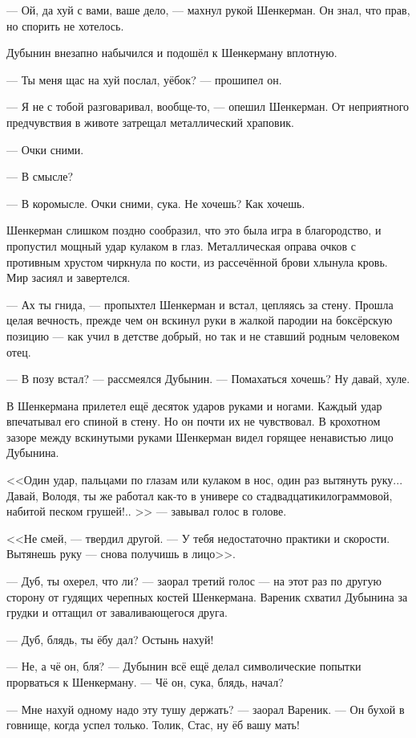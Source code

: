\documentclass[a4paper,10pt,fleqn]{book}\usepackage{polyglossia}\setdefaultlanguage{english}\setotherlanguage{russian}\defaultfontfeatures{Ligatures=TeX,Mapping=tex-text} \usepackage{xcolor}\definecolor{lightgray}{HTML}{bbbbbb}\color{lightgray}\newcommand{\ml}[3]{\textcolor{black}{#3}}
\begin{document}
--- Ой, да хуй с вами, ваше дело, --- махнул рукой Шенкерман.
Он знал, что прав, но спорить не хотелось.

Дубынин внезапно набычился и подошёл к Шенкерману вплотную.

--- Ты меня щас на хуй послал, уёбок? --- прошипел он.

--- Я не с тобой разговаривал, вообще-то, --- опешил Шенкерман.
От неприятного предчувствия в животе затрещал металлический храповик.

--- Очки сними.

--- В смысле?

--- В коромысле.
Очки сними, сука.
Не хочешь?
Как хочешь.

Шенкерман слишком поздно сообразил, что это была игра в благородство, и пропустил мощный удар кулаком в глаз.
Металлическая оправа очков с противным хрустом чиркнула по кости, из рассечённой брови хлынула кровь.
Мир засиял и завертелся.

--- Ах ты гнида, --- пропыхтел Шенкерман и встал, цепляясь за стену.
Прошла целая вечность, прежде чем он вскинул руки в жалкой пародии на боксёрскую позицию --- как учил в детстве добрый, но так и не ставший родным человеком отец.

--- В позу встал? --- рассмеялся Дубынин.
--- Помахаться хочешь?
Ну давай, хуле.

В Шенкермана прилетел ещё десяток ударов руками и ногами.
Каждый удар впечатывал его спиной в стену.
Но он почти их не чувствовал.
В крохотном зазоре между вскинутыми руками Шенкерман видел горящее ненавистью лицо Дубынина.

<<Один удар, пальцами по глазам или кулаком в нос, один раз вытянуть руку...
Давай, Володя, ты же работал как-то в универе со стадвадцатикилограммовой, набитой песком грушей!.. >> --- завывал голос в голове.

<<Не смей, --- твердил другой.
--- У тебя недостаточно практики и скорости.
Вытянешь руку --- снова получишь в лицо>>.

--- Дуб, ты охерел, что ли? --- заорал третий голос --- на этот раз по другую сторону от гудящих черепных костей Шенкермана.
Вареник схватил Дубынина за грудки и оттащил от заваливающегося друга.

--- Дуб, блядь, ты ёбу дал?
Остынь нахуй!

--- Не, а чё он, бля? --- Дубынин всё ещё делал символические попытки прорваться к Шенкерману.
--- Чё он, сука, блядь, начал?

--- Мне нахуй одному надо эту тушу держать? --- заорал Вареник.
--- Он бухой в говнище, когда успел только.
Толик, Стас, ну ёб вашу мать!
\end{document}
